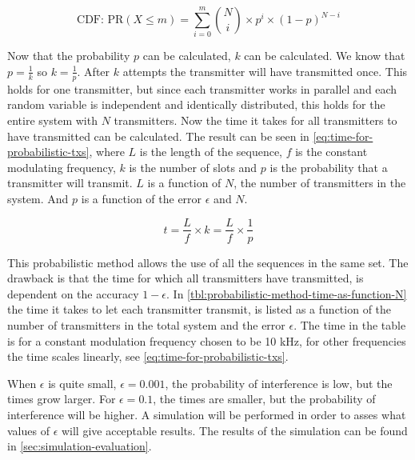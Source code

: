 \begin{equation}
	\label{eq:cdf-binomial}
	\text{CDF:  PR}(X \le m) = \displaystyle\sum_{i=0}^{m} \binom Ni \times p^i \times (1 - p)^{N-i}
\end{equation}


Now that the probability $p$ can be calculated, $k$ can be calculated.
We know that $p = \frac{1}{k}$ so $k = \frac{1}{p}$.
After $k$ attempts the transmitter will have transmitted once.
This holds for one transmitter, but since each transmitter works in parallel and each random variable is independent and identically distributed, this holds for the entire system with $N$ transmitters.
Now the time it takes for all transmitters to have transmitted can be calculated.
The result can be seen in \autoref{eq:time-for-probabilistic-txs}, where $L$ is the length of the sequence, $f$ is the constant modulating frequency, $k$ is the number of slots and $p$ is the probability that a transmitter will transmit.
$L$ is a function of $N$, the number of transmitters in the system.
And $p$ is a function of the error $\epsilon$ and $N$.

\begin{equation}
	\label{eq:time-for-probabilistic-txs}
	t = \frac{L}{f} \times k = \frac{L}{f} \times \frac{1}{p}
\end{equation}

This probabilistic method allows the use of all the sequences in the same set.
The drawback is that the time for which all transmitters have transmitted, is dependent on the accuracy $1 - \epsilon$.
In \autoref{tbl:probabilistic-method-time-as-function-N} the time it takes to let each transmitter transmit, is listed as a function of the number of transmitters in the total system and the error $\epsilon$. 
The time in the table is for a constant modulation frequency chosen to be 10 kHz, for other frequencies the time scales linearly, see \autoref{eq:time-for-probabilistic-txs}.






When $\epsilon$ is quite small, $\epsilon = 0.001$, the probability of interference is low, but the times grow larger. 
For $\epsilon = 0.1$, the times are smaller, but the probability of interference will be higher.
A simulation will be performed in order to asses what values of $\epsilon$  will give acceptable results.
The results of the simulation can be found in \autoref{sec:simulation-evaluation}.




